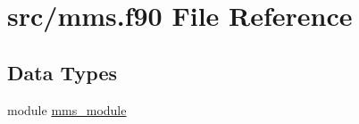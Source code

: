 \hypertarget{mms_8f90}{\section{src/mms.f90 File Reference}
\label{mms_8f90}
}
\subsection*{Data Types}
\begin{DoxyCompactItemize}
\item 
module \hyperlink{classmms__module}{mms\-\_\-module}
\end{DoxyCompactItemize}
